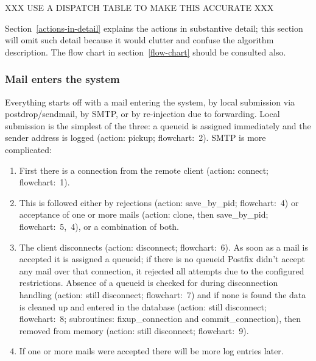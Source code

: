 \documentclass[a4paper,12pt,draft]{article}
\begin{document}
XXX USE A DISPATCH TABLE TO MAKE THIS ACCURATE XXX

Section~\ref{actions-in-detail} explains the actions in substantive detail;
this section will omit such detail because it would clutter and confuse the
algorithm description.  The flow chart in section~\ref{flow-chart} should
be consulted also.

\subsubsection{Mail enters the system}

\label{mail-enters-the-system}

Everything starts off with a mail entering the system, by local submission
via postdrop/sendmail, by SMTP, or by re-injection due to forwarding.
Local submission is the simplest of the three: a queueid is assigned
immediately and the sender address is logged (action: pickup;
flowchart:~2).  SMTP is more complicated: 

\begin{enumerate}
        
    \item First there is a connection from the remote client
        (action: connect; flowchart:~1).

    \item This is followed either by rejections (action: save\_by\_pid;
        flowchart:~4) or acceptance of one or more mails (action: clone,
        then save\_by\_pid; flowchart:~5,~4), or a combination of both.
        
    \item The client disconnects (action: disconnect; flowchart:~6).  As
        soon as a mail is accepted it is assigned a queueid; if there is no
        queueid Postfix didn't accept any mail over that connection, it
        rejected all attempts due to the configured restrictions.  Absence
        of a queueid is checked for during disconnection handling (action:
        still disconnect; flowchart:~7) and if none is found the data is
        cleaned up and entered in the database (action: still disconnect;
        flowchart:~8; subroutines: fixup\_connection and
        commit\_connection), then removed from memory (action: still
        disconnect; flowchart:~9).

    \item If one or more mails were accepted there will be more log entries
        later.

\end{enumerate}
\end{document}
